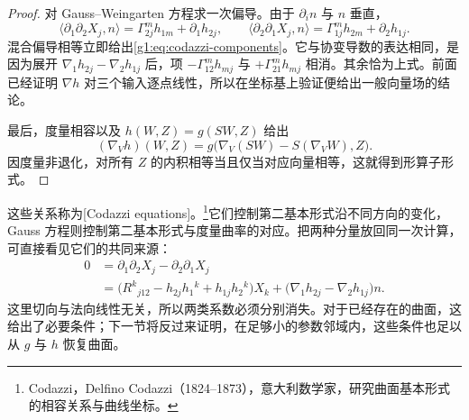 \begin{proof}
	对 Gauss–Weingarten 方程求一次偏导。由于 \(\partial_i n\) 与 \(n\) 垂直，
	\[
		\langle\partial_1\partial_2X_j,n\rangle
		=\Gamma^m_{2j}h_{1m}+\partial_1h_{2j},\qquad
		\langle\partial_2\partial_1X_j,n\rangle
		=\Gamma^m_{1j}h_{2m}+\partial_2h_{1j}.
	\]
	混合偏导相等立即给出\eqref{g1:eq:codazzi-components}。它与协变导数的表达相同，是因为展开 \(\nabla_1h_{2j}-\nabla_2h_{1j}\) 后，项 \(-\Gamma^m_{12}h_{mj}\) 与 \(+\Gamma^m_{21}h_{mj}\) 相消。其余恰为上式。前面已经证明 \(\nabla h\) 对三个输入逐点线性，所以在坐标基上验证便给出一般向量场的结论。

	最后，度量相容以及 \(h(W,Z)=g(SW,Z)\) 给出
	\[
		(\nabla_Vh)(W,Z)
		=g\bigl(\nabla_V(SW)-S(\nabla_VW),Z\bigr).
	\]
	因度量非退化，对所有 \(Z\) 的内积相等当且仅当对应向量相等，这就得到形算子形式。
\end{proof}

这些关系称为[Codazzi equations]。\footnote{Codazzi，Delfino Codazzi（1824--1873），意大利数学家，研究曲面基本形式的相容关系与曲线坐标。}它们控制第二基本形式沿不同方向的变化，Gauss 方程则控制第二基本形式与度量曲率的对应。把两种分量放回同一次计算，可直接看见它们的共同来源：
\begin{equation}
	\label{g1:eq:mixed-surface-derivatives}
	\begin{aligned}
		0&=\partial_1\partial_2X_j-\partial_2\partial_1X_j\\
		&=\bigl(R^k{}_{j12}-h_{2j}h_1{}^k+h_{1j}h_2{}^k\bigr)X_k
		+\bigl(\nabla_1h_{2j}-\nabla_2h_{1j}\bigr)n.
	\end{aligned}
\end{equation}
这里切向与法向线性无关，所以两类系数必须分别消失。对于已经存在的曲面，这给出了必要条件；下一节将反过来证明，在足够小的参数邻域内，这些条件也足以从 \(g\) 与 \(h\) 恢复曲面。
